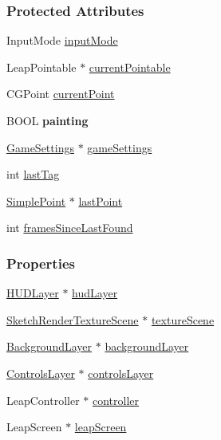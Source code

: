 \subsubsection*{Protected Attributes}
\begin{DoxyCompactItemize}
\item 
Input\-Mode \hyperlink{interface_game_manager_a43f8cf09eea5b0766c73b0d2b258644c}{input\-Mode}
\item 
Leap\-Pointable $\ast$ \hyperlink{interface_game_manager_a9899e94be0e9364a59e5b76d5025d9f7}{current\-Pointable}
\item 
C\-G\-Point \hyperlink{interface_game_manager_a880d3cc994cc208b57a97fac088c2781}{current\-Point}
\item 
\hypertarget{interface_game_manager_a71f6112c6ebea5c0083db68cdb0e01d8}{B\-O\-O\-L {\bfseries painting}}\label{d4/d94/interface_game_manager_a71f6112c6ebea5c0083db68cdb0e01d8}

\item 
\hyperlink{interface_game_settings}{Game\-Settings} $\ast$ \hyperlink{interface_game_manager_a97ff3b8cd0cbc6baf6f5abe3bb3417ca}{game\-Settings}
\item 
int \hyperlink{interface_game_manager_a0b83b09829718f85c17d64f6ee06d441}{last\-Tag}
\item 
\hyperlink{interface_simple_point}{Simple\-Point} $\ast$ \hyperlink{interface_game_manager_a4f2a6986ffdbc41d661e90deaee4551a}{last\-Point}
\item 
int \hyperlink{interface_game_manager_a546c4660d830a79c27bc2a51da00df12}{frames\-Since\-Last\-Found}
\end{DoxyCompactItemize}
\subsubsection*{Properties}
\begin{DoxyCompactItemize}
\item 
\hyperlink{interface_h_u_d_layer}{H\-U\-D\-Layer} $\ast$ \hyperlink{interface_game_manager_ae286fb2f9d31810d73c7231a574b56b0}{hud\-Layer}
\item 
\hyperlink{interface_sketch_render_texture_scene}{Sketch\-Render\-Texture\-Scene} $\ast$ \hyperlink{interface_game_manager_a79a86ff991f39b3007d99ca61af21253}{texture\-Scene}
\item 
\hyperlink{interface_background_layer}{Background\-Layer} $\ast$ \hyperlink{interface_game_manager_a2a3a96f1202b13592f244cf1402b4051}{background\-Layer}
\item 
\hyperlink{interface_controls_layer}{Controls\-Layer} $\ast$ \hyperlink{interface_game_manager_a0ee5903be06e4a676ddde4c1f03530a7}{controls\-Layer}
\item 
Leap\-Controller $\ast$ \hyperlink{interface_game_manager_a4b089253ae3569099d28535b128f3436}{controller}
\item 
Leap\-Screen $\ast$ \hyperlink{interface_game_manager_a85cb30e21c987f66855a762c6ba88096}{leap\-Screen}
\end{DoxyCompactItemize}


